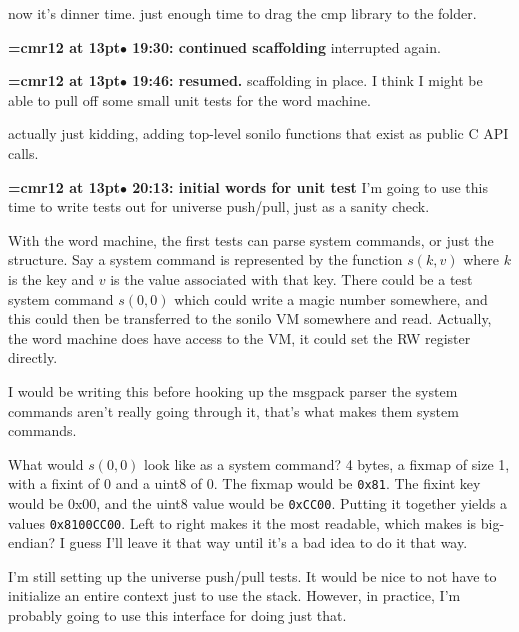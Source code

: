 now it's dinner time. just enough time to drag the cmp library to the folder.
\par

{\smallskip\noindent\bf\font\titlefont=cmr12 at 13pt\titlefont $\bullet$ 19:30: continued scaffolding}\smallskip
interrupted again.
\par

{\smallskip\noindent\bf\font\titlefont=cmr12 at 13pt\titlefont $\bullet$ 19:46: resumed.}\smallskip
scaffolding in place. I think I might be able to pull off some small unit tests for the word machine.
\par

actually just kidding, adding top-level sonilo functions that exist as public C API calls.
\par

{\smallskip\noindent\bf\font\titlefont=cmr12 at 13pt\titlefont $\bullet$ 20:13: initial words for unit test}\smallskip
I'm going to use this time to write tests out for universe push/pull, just as a sanity check.
\par

With the word machine, the first tests can parse system commands, or just the structure. Say a system command is represented by the function $s(k,v)$ where $k$ is the key and $v$ is the value associated with that key. There could be a test system command $s(0, 0)$ which could write a magic number somewhere, and this could then be transferred to the sonilo VM somewhere and read. Actually, the word machine does have access to the VM, it could set the RW register directly.
\par

I would be writing this before hooking up the msgpack parser the system commands aren't really going through it, that's what makes them system commands.
\par

What would $s(0,0)$ look like as a system command? 4 bytes, a fixmap of size 1, with a fixint of 0 and a uint8 of 0. The fixmap would be {\tt 0x81}. The fixint key would be {0x00}, and the uint8 value would be {\tt 0xCC00}. Putting it together yields a values {\tt 0x8100CC00}. Left to right makes it the most readable, which makes is big-endian? I guess I'll leave it that way until it's a bad idea to do it that way.
\par

I'm still setting up the universe push/pull tests. It would be nice to not have to initialize an entire context just to use the stack. However, in practice, I'm probably going to use this interface for doing just that.
\par


